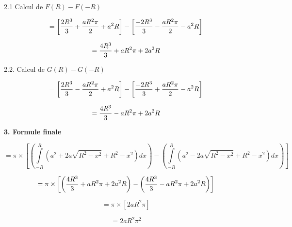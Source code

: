\documentclass[10pt]{article}
\begin{document}
2.1 Calcul de $F(R)-F(-R)$\vspace{0.2cm}

$$=\left[{2R^3\over{3}}+{aR^2\pi\over{2}}+a^2R\right]-\left[{-2R^3\over{3}}-{aR^2\pi\over{2}} - a^2R\right]$$

$$={4R^3\over{3}}+aR^2\pi + 2a^2R$$\vspace{0.01cm}

2.2. Calcul de $G(R)-G(-R)$\vspace{0.2cm}

$$=\left[{2R^3\over{3}}-{aR^2\pi\over{2}}+a^2R\right]-\left[{-2R^3\over{3}}+{aR^2\pi\over{2}} - a^2R\right]$$

$$={4R^3\over{3}}-aR^2\pi + 2a^2R$$

\newpage

\textbf{3. Formule finale}\vspace{0.2cm}

$$=\pi\times\left[\left(\int\limits_{-R}^R (a^2+2a\sqrt{R^2-x^2}+R^2-x^2)dx\right)-\left(\int\limits_{-R}^R (a^2-2a\sqrt{R^2-x^2}+R^2-x^2)dx\right)\right]$$

$$=\pi\times\left[\left({4R^3\over{3}}+aR^2\pi + 2a^2R\right)-\left({4R^3\over{3}}-aR^2\pi + 2a^2R\right)\right]$$

$$=\pi\times\left[2aR^2\pi\right]$$

$$=2aR^2\pi^2$$

\end{document}
